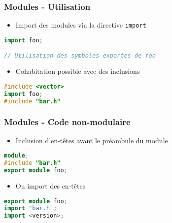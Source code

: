 \documentclass[C++.tex]{subfiles}
\begin{document}
\begin{frame}[fragile]
	\frametitle{Modules - Utilisation}
	\begin{itemize}
		\item Import des modules via la directive \lstinline|import|
	\end{itemize}

	\begin{lstlisting}[language=C++]
import foo;

// Utilisation des symboles exportes de foo\end{lstlisting}

	\begin{itemize}
		\item Cohabitation possible avec des inclusions
	\end{itemize}

	\begin{lstlisting}[language=C++]
#include <vector>
import foo;
#include "bar.h"\end{lstlisting}
\end{frame}

\begin{frame}[fragile]
	\frametitle{Modules - Code non-modulaire}
	\begin{itemize}
		\item Inclusion d'en-têtes avant le préambule du module
	\end{itemize}


	\begin{lstlisting}[language=C++]
module;
#include "bar.h"
export module foo;\end{lstlisting}
	
	\begin{itemize}
		\item Ou import des en-têtes
	\end{itemize}


	\begin{lstlisting}[language=C++]
export module foo;
import "bar.h";
import <version>;\end{lstlisting}
\end{frame}
\end{document}
